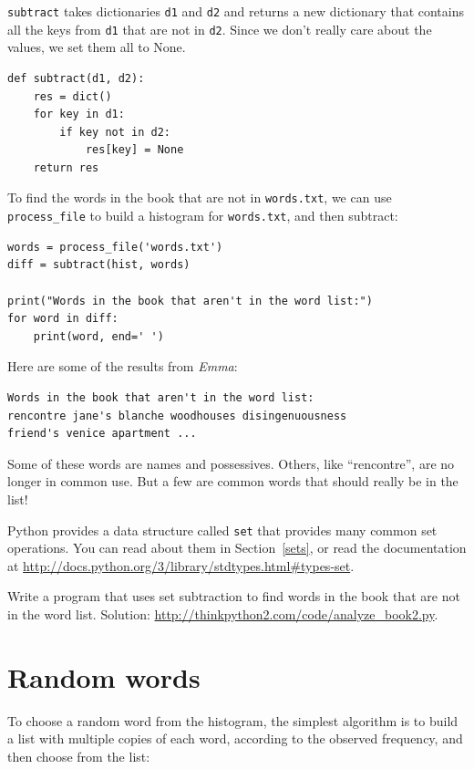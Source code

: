 \documentclass[10pt]{book}
\begin{document}
{\tt subtract} takes dictionaries {\tt d1} and {\tt d2} and returns a
new dictionary that contains all the keys from {\tt d1} that are not
in {\tt d2}.  Since we don't really care about the values, we
set them all to None.

\begin{verbatim}
def subtract(d1, d2):
    res = dict()
    for key in d1:
        if key not in d2:
            res[key] = None
    return res
\end{verbatim}
%
To find the words in the book that are not in {\tt words.txt},
we can use \verb"process_file" to build a histogram for
{\tt words.txt}, and then subtract:

\begin{verbatim}
words = process_file('words.txt')
diff = subtract(hist, words)

print("Words in the book that aren't in the word list:")
for word in diff:
    print(word, end=' ')
\end{verbatim}
%
Here are some of the results from {\em Emma}:

\begin{verbatim}
Words in the book that aren't in the word list:
rencontre jane's blanche woodhouses disingenuousness 
friend's venice apartment ...
\end{verbatim}
%
Some of these words are names and possessives.  Others, like
``rencontre'', are no longer in common use.  But a few are common
words that should really be in the list!

\begin{exercise}

Python provides a data structure called {\tt set} that provides many
common set operations.  You can read about them in Section~\ref{sets},
or read the documentation at
\url{http://docs.python.org/3/library/stdtypes.html#types-set}.

Write a program that uses set subtraction to find words in the book
that are not in the word list.  Solution:
\url{http://thinkpython2.com/code/analyze_book2.py}.

\end{exercise}


\section{Random words}
\label{randomwords}

To choose a random word from the histogram, the simplest algorithm
is to build a list with multiple copies of each word, according
to the observed frequency, and then choose from the list:
\end{document}

